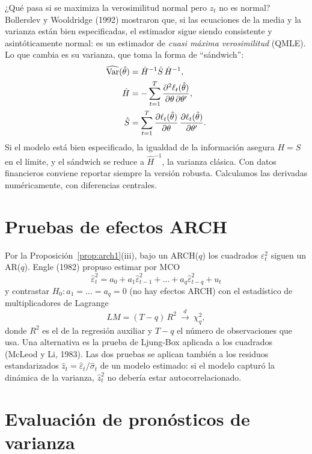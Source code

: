 ¿Qué pasa si se maximiza la verosimilitud normal pero $z_t$ no es normal? Bollerslev y Wooldridge (1992)
mostraron que, si las ecuaciones de la media y la varianza están bien especificadas, el estimador sigue siendo
consistente y asintóticamente normal: es un estimador de \emph{cuasi máxima verosimilitud} (QMLE). Lo que
cambia es su varianza, que toma la forma de ``sándwich'':
\begin{align*}
  \widehat{\operatorname{Var}}(\hat\theta) &= \hat H^{-1}\hat S\,\hat H^{-1},\\
  \hat H &= -\sum_{t=1}^{T}\frac{\partial^2\ell_t(\hat\theta)}{\partial\theta\,\partial\theta'},\\
  \hat S &= \sum_{t=1}^{T}\frac{\partial\ell_t(\hat\theta)}{\partial\theta}\,
            \frac{\partial\ell_t(\hat\theta)}{\partial\theta'} .
\end{align*}
Si el modelo está bien especificado, la igualdad de la información asegura $H=S$ en el límite, y el sándwich
se reduce a $\hat H^{-1}$, la varianza clásica. Con datos financieros conviene reportar siempre la versión
robusta. Calculamos las derivadas numéricamente, con diferencias centrales.

\section{Pruebas de efectos ARCH}

Por la Proposición~\ref{prop:arch1}(iii), bajo un ARCH($q$) los cuadrados $\varepsilon_t^2$ siguen un AR($q$).
Engle (1982) propuso estimar por MCO
\[
  \hat\varepsilon_t^2=a_0+a_1\hat\varepsilon_{t-1}^2+\dots+a_q\hat\varepsilon_{t-q}^2+u_t
\]
y contrastar $H_0:a_1=\dots=a_q=0$ (no hay efectos ARCH) con el estadístico de multiplicadores de Lagrange
\[
  LM=(T-q)\,R^2\ \xrightarrow{d}\ \chi^2_q ,
\]
donde $R^2$ es el de la regresión auxiliar y $T-q$ el número de observaciones que usa. Una alternativa es la
prueba de Ljung-Box aplicada a los cuadrados (McLeod y Li, 1983). Las dos pruebas se aplican también a los
residuos estandarizados $\hat z_t=\hat\varepsilon_t/\hat\sigma_t$ de un modelo estimado: si el modelo capturó la
dinámica de la varianza, $\hat z_t^2$ no debería estar autocorrelacionado.

\section{Evaluación de pronósticos de varianza}

